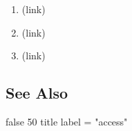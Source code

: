 \begin{enumerate} \item  (link) \href{NIST SP 800-63-3-R3, 2020 }{ } \item  (link) \href{RfC 2828, 2000 }{ } \item  (link) \href{Saltzer and Schroeder, 1975 }{ } \end{enumerate} \subsection*{See Also } false  50  title  label = "access"  
